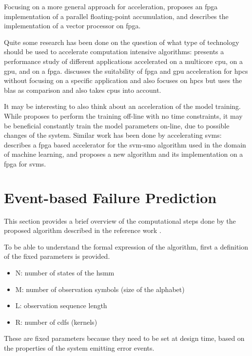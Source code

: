 \documentclass[mscthesis]{usiinfthesis}
\begin{document}
Focusing on a more general approach for acceleration, \cite{ARITH13_Kadric}
proposes an \gls{fpga} implementation of a parallel floating-point accumulation,
and \cite{ITNG07_Yang} describes the implementation of a vector processor on
\gls{fpga}.

Quite some research has been done on the question of what type of technology
should be used to accelerate computation intensive algorithms:
\cite{SASP08_Che} presents a performance study of different applications
accelerated on a multicore \gls{cpu}, on a \gls{gpu}, and on a \gls{fpga}.
\cite{FPL10_Jones} discusses the suitability of \gls{fpga} and \gls{gpu}
acceleration for \gls{hpcs} without focusing on a specific application and
\cite{ISVLSI10_Kestur} also focuses on \gls{hpcs} but uses the \gls{blas} as
comparison and also takes \glspl{cpu} into account.

It may be interesting to also think about an acceleration of the model
training. While \cite{salfner08} proposes to perform the training off-line with
no time constraints, it may be beneficial constantly train the model parameters
on-line, due to possible changes of the system. Similar work has been done by
accelerating \glspl{svm}: \cite{FCCM09_Cadambi} describes a \gls{fpga} based
accelerator for the \gls{svm}-\gls{smo} algorithm used in the domain of machine
learning, and \cite{IEEE03_Anguita} proposes a new algorithm and its
implementation on a \gls{fpga} for \glspl{svm}.

\chapter{Event-based Failure Prediction}
\label{ch:event}
\glsresetall %

This section provides a brief overview of the computational steps done by the
proposed algorithm described in the reference work \cite{salfner08}.

To be able to understand the formal expression of the algorithm, first
a definition of the fixed parameters is provided.
\begin{itemize}
    \item N: number of states of the \gls{hsmm}
    \item M: number of observation symbols (size of the alphabet)
    \item L: observation sequence length
    \item R: number of \glspl{cdf} (kernels)
\end{itemize}
These are fixed parameters because they need to be set at design time,
based on the properties of the system emitting error events.
\end{document}
